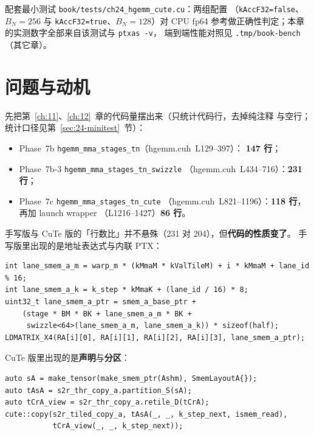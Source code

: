 配套最小测试 \texttt{book/\allowbreak{}tests/\allowbreak{}ch24\_\allowbreak{}hgemm\_\allowbreak{}cute.cu}：两组配置
（\texttt{k\allowbreak{}Acc\allowbreak{}F32=\allowbreak{}false}、$B_N=256$ 与 \texttt{k\allowbreak{}Acc\allowbreak{}F32=\allowbreak{}true}、$B_N=128$）对 CPU
fp64 参考做正确性判定；本章的实测数字全部来自该测试与 \texttt{ptxas -v}，
端到端性能对照见 \texttt{.\allowbreak{}tmp/\allowbreak{}book-bench}（其它章）。

\section{问题与动机}

先把第~\ref{ch:11}、\ref{ch:12}~章的代码量摆出来（只统计代码行，去掉纯注释
与空行；统计口径见第~\ref{sec:24-minitest}~节）：

\begin{itemize}
  \item Phase~7b \texttt{hgemm\_\allowbreak{}mma\_\allowbreak{}stages\_\allowbreak{}tn}（hgemm.cuh~L129--397）：
        \textbf{147 行}；
  \item Phase~7b-3 \texttt{hgemm\_\allowbreak{}mma\_\allowbreak{}stages\_\allowbreak{}tn\_\allowbreak{}swizzle}
        （hgemm.cuh~L434--716）：\textbf{231 行}；
  \item Phase~7c \texttt{hgemm\_\allowbreak{}mma\_\allowbreak{}stages\_\allowbreak{}tn\_\allowbreak{}cute}
        （hgemm.cuh~L821--1196）：\textbf{118 行}，再加 launch wrapper
        （L1216--1427）\textbf{86 行}。
\end{itemize}

手写版与 CuTe 版的「行数比」并不悬殊（231 对 204），但\textbf{代码的性质变了}。
手写版里出现的是地址表达式与内联 PTX：

\begin{lstlisting}
int lane_smem_a_m = warp_m * (kMmaM * kValTileM) + i * kMmaM + lane_id % 16;
int lane_smem_a_k = k_step * kMmaK + (lane_id / 16) * 8;
uint32_t lane_smem_a_ptr = smem_a_base_ptr +
    (stage * BM * BK + lane_smem_a_m * BK +
     swizzle<64>(lane_smem_a_m, lane_smem_a_k)) * sizeof(half);
LDMATRIX_X4(RA[i][0], RA[i][1], RA[i][2], RA[i][3], lane_smem_a_ptr);
\end{lstlisting}

CuTe 版里出现的是\textbf{声明}与\textbf{分区}：

\begin{lstlisting}
auto sA = make_tensor(make_smem_ptr(Ashm), SmemLayoutA{});
auto tAsA = s2r_thr_copy_a.partition_S(sA);
auto tCrA_view = s2r_thr_copy_a.retile_D(tCrA);
cute::copy(s2r_tiled_copy_a, tAsA(_, _, k_step_next, ismem_read),
           tCrA_view(_, _, k_step_next));
\end{lstlisting}

